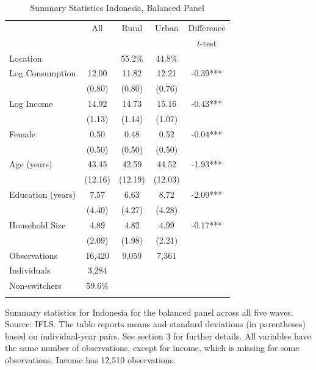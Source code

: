 \begin{table}[htbp] \centering \caption{Summary Statistics Indonesia, Balanced Panel}\label{tab:summary_stats_IDN_bal} \begin{threeparttable} \begin{tabular}{l cccc} \toprule
& All & Rural & Urban & Difference \\
 &  &  &  & $t$-test \\
\midrule
Location &  &   55.2\% &   44.8\% &  \\  \addlinespace \addlinespace
Log Consumption & 12.00 & 11.82 & 12.21 & -0.39*** \\
 & (0.80) & (0.80) & (0.76) &  \\  \addlinespace
Log Income & 14.92 & 14.73 & 15.16 & -0.43*** \\
 & (1.13) & (1.14) & (1.07) &  \\  \addlinespace
Female & 0.50 & 0.48 & 0.52 & -0.04*** \\
 & (0.50) & (0.50) & (0.50) &  \\  \addlinespace
Age (years) & 43.45 & 42.59 & 44.52 & -1.93*** \\
 & (12.16) & (12.19) & (12.03) &  \\  \addlinespace
Education (years) & 7.57 & 6.63 & 8.72 & -2.09*** \\
 & (4.40) & (4.27) & (4.28) &  \\  \addlinespace
Household Size & 4.89 & 4.82 & 4.99 & -0.17*** \\
 & (2.09) & (1.98) & (2.21) &  \\  \addlinespace


\cmidrule{2-5}
Observations & 16,420 & 9,059 & 7,361 &  \\  
Individuals & 3,284 &  &  &  \\
Non-switchers &   59.6\% &  &  &  \\  \addlinespace
\bottomrule \end{tabular} \begin{tablenotes}[flushleft] \footnotesize \item{Summary statistics for Indonesia for the balanced panel across all five waves. Source: IFLS. The table reports means and standard deviations (in parentheses) based on individual-year pairs. See section 3 for further details. All variables have the same number of observations, except for income, which is missing for some observations. Income has 12,510 observations.} \end{tablenotes} \end{threeparttable} \end{table}